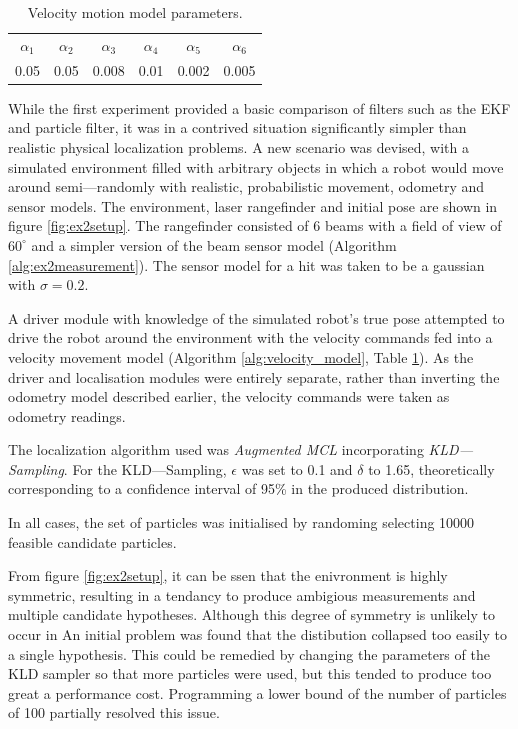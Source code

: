 \documentclass[english]{article}
\begin{document}
\begin{table}[htp]
\begin{center}
\begin{tabular}{|c|c|c|c|c|c|}
\hline
$\alpha_1$ & $\alpha_2$ & $\alpha_3$ & $\alpha_4$ & $\alpha_5$ & $\alpha_6$ \\
0.05 & 0.05 & 0.008 & 0.01 & 0.002 & 0.005\\
\hline
\end{tabular}
\end{center}
\caption{Velocity motion model parameters.}
\label{tbl:velparam}
\end{table}


While the first experiment provided a basic comparison of filters such as the EKF and particle filter, it was in a contrived situation significantly simpler than realistic physical localization problems. A new scenario was devised, with a simulated environment filled with arbitrary objects in which a robot would move around semi---randomly with realistic, probabilistic movement, odometry and sensor models. The environment, laser rangefinder and initial pose are shown in figure \ref{fig:ex2setup}. The rangefinder consisted of 6 beams with a field of view of $60^{\circ}$ and a simpler version of the beam sensor model (Algorithm \ref{alg:ex2measurement}). The sensor model for a hit was taken to be a gaussian with $\sigma = 0.2$.

A driver module with knowledge of the simulated robot's true pose attempted to drive the robot around the environment with the velocity commands fed into a velocity movement model (Algorithm \ref{alg:velocity_model}, Table \ref{tbl:velparam}). As the driver and localisation modules were entirely separate, rather than inverting the odometry model described earlier, the velocity commands were taken as odometry readings.

The localization algorithm used was \emph{Augmented MCL} incorporating \emph{KLD---Sampling}. For the KLD---Sampling, $\epsilon$ was set to 0.1 and $\delta$ to 1.65, theoretically corresponding to a confidence interval of 95\% in the produced distribution. 

In all cases, the set of particles was initialised by randoming selecting 10000 feasible candidate particles.

From figure \ref{fig:ex2setup}, it can be ssen that the enivronment is highly symmetric, resulting in a tendancy to produce ambigious measurements and multiple candidate hypotheses. Although this degree of symmetry is unlikely to occur in An initial problem was found that the distibution collapsed too easily to a single hypothesis. This could be remedied by changing the parameters of the KLD sampler so that more particles were used, but this tended to produce too great a performance cost. Programming a lower bound of the number of particles of 100 partially resolved this issue.
\end{document}
